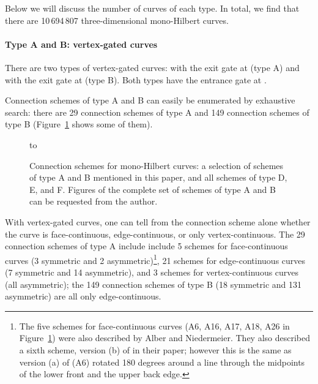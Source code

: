 \documentclass[11pt,a4paper]{article}
\begin{document}
Below we will discuss the number of curves of each type. In total, we find that there are 10\,694\,807 three-dimensional mono-Hilbert curves.

\paragraph{Type A and B: vertex-gated curves}
There are two types of vertex-gated curves: with the exit gate at  (type A) and with the exit gate at  (type B). Both types have the entrance gate at .

Connection schemes of type A and B can easily be enumerated by exhaustive search: there are 29 connection schemes of type A and 149 connection schemes of type B (Figure~\ref{fig:connection-schemes} shows some of them).

\begin{figure}
\centering
\hbox to
\caption{Connection schemes for mono-Hilbert curves: a selection of schemes of type A and B mentioned in this paper, and all schemes of type D, E, and F. Figures of the complete set of schemes of type A and B can be requested from the author.}\label{fig:connection-schemes}
\end{figure}

With vertex-gated curves, one can tell from the connection scheme alone whether the curve is face-continuous, edge-continuous, or only vertex-continuous. The 29 connection schemes of type A include include 5 schemes for face-continuous curves (3 symmetric and 2 asymmetric)\footnote{The five schemes for face-continuous curves (A6, A16, A17, A18, A26 in Figure~\ref{fig:connection-schemes}) were also described by Alber and Niedermeier. They also described a sixth scheme, version (b) of  in their paper; however this is the same as version (a) of  (A6) rotated 180 degrees around a line through the midpoints of the lower front and the upper back edge.}, 21 schemes for edge-continuous curves (7 symmetric and 14 asymmetric), and 3 schemes for vertex-continuous curves (all asymmetric); the 149 connection schemes of type B (18 symmetric and 131 asymmetric) are all only edge-continuous.
\end{document}
